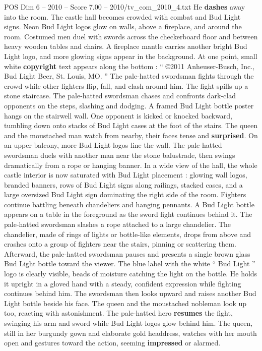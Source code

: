 \begin{textsample}{POS Dim 6 – 2010 – Score 7.00 – 2010/tv\_com\_2010\_4.txt}
He \textbf{dashes} away into the room.
The castle hall becomes crowded with combat and Bud Light signs.
Neon Bud Light logos glow on walls, above a fireplace, and around the room.
Costumed men duel with swords across the checkerboard floor and between heavy wooden tables and chairs.
A fireplace mantle carries another bright Bud Light logo, and more glowing signs appear in the background.
At one point, small white \textbf{copyright} text appears along the bottom : “ {\EmojiFont ©}2011 Anheuser-Busch, Inc., Bud Light Beer, St.
Louis, MO. ” The pale-hatted swordsman fights through the crowd while other fighters flip, fall, and clash around him.
The fight spills up a stone staircase.
The pale-hatted swordsman chases and confronts dark-clad opponents on the steps, slashing and dodging.
A framed Bud Light bottle poster hangs on the stairwell wall.
One opponent is kicked or knocked backward, tumbling down onto stacks of Bud Light cases at the foot of the stairs.
The queen and the moustached man watch from nearby, their faces tense and \textbf{surprised}.
On an upper balcony, more Bud Light logos line the wall.
The pale-hatted swordsman duels with another man near the stone balustrade, then swings dramatically from a rope or hanging banner.
In a wide view of the hall, the whole castle interior is now saturated with Bud Light placement : glowing wall logos, branded banners, rows of Bud Light signs along railings, stacked cases, and a large oversized Bud Light sign dominating the right side of the room.
Fighters continue battling beneath chandeliers and hanging pennants.
A Bud Light bottle appears on a table in the foreground as the sword fight continues behind it.
The pale-hatted swordsman slashes a rope attached to a large chandelier.
The chandelier, made of rings of lights or bottle-like elements, drops from above and crashes onto a group of fighters near the stairs, pinning or scattering them.
Afterward, the pale-hatted swordsman pauses and presents a single brown glass Bud Light bottle toward the viewer.
The blue label with the white “ Bud Light ” logo is clearly visible, beads of moisture catching the light on the bottle.
He holds it upright in a gloved hand with a steady, confident expression while fighting continues behind him.
The swordsman then looks upward and raises another Bud Light bottle beside his face.
The queen and the moustached nobleman look up too, reacting with astonishment.
The pale-hatted hero \textbf{resumes} the fight, swinging his arm and sword while Bud Light logos glow behind him.
The queen, still in her burgundy gown and elaborate gold headdress, watches with her mouth open and gestures toward the action, seeming \textbf{impressed} or alarmed.

\end{textsample}
